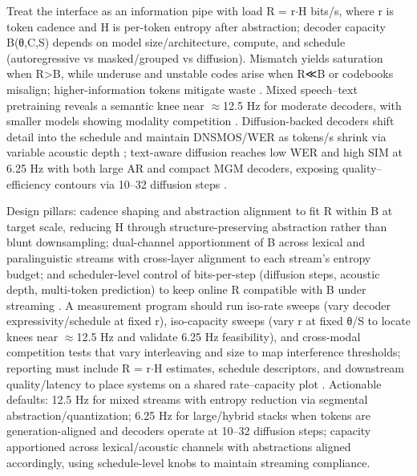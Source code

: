 \documentclass{article}
\begin{document}
Treat the interface as an information pipe with load R = r$\cdot$H bits/s, where r is token cadence and H is per-token entropy after abstraction; decoder capacity B(θ,C,S) depends on model size/architecture, compute, and schedule (autoregressive vs masked/grouped vs diffusion). Mismatch yields saturation when R>B, while underuse and unstable codes arise when R≪B or codebooks misalign; higher-information tokens mitigate waste \cite{huang2024repcodecspeechrepresentationcodectokeniz,chen2023reducingbarriersselfsupervisedlearninghu}. Mixed speech--text pretraining reveals a semantic knee near $\approx$12.5 Hz for moderate decoders, with smaller models showing modality competition \cite{zeng2024scalingspeechtextpretrainingsyntheticint}. Diffusion-backed decoders shift detail into the schedule and maintain DNSMOS/WER as tokens/s shrink via variable acoustic depth \cite{yang2025diffsoundstreamefficientspeechtokenizati}; text-aware diffusion reaches low WER and high SIM at 6.25 Hz with both large AR and compact MGM decoders, exposing quality--efficiency contours via 10--32 diffusion steps \cite{wang2025tadicodectextawarediffusionspeechtokeniz}.

Design pillars: cadence shaping and abstraction alignment to fit R within B at target scale, reducing H through structure-preserving abstraction rather than blunt downsampling; dual-channel apportionment of B across lexical and paralinguistic streams with cross-layer alignment to each stream's entropy budget; and scheduler-level control of bits-per-step (diffusion steps, acoustic depth, multi-token prediction) to keep online R compatible with B under streaming \cite{zeng2024scalingspeechtextpretrainingsyntheticint,yang2025diffsoundstreamefficientspeechtokenizati,wang2025tadicodectextawarediffusionspeechtokeniz}. A measurement program should run iso-rate sweeps (vary decoder expressivity/schedule at fixed r), iso-capacity sweeps (vary r at fixed θ/S to locate knees near $\approx$12.5 Hz and validate 6.25 Hz feasibility), and cross-modal competition tests that vary interleaving and size to map interference thresholds; reporting must include R = r$\cdot$H estimates, schedule descriptors, and downstream quality/latency to place systems on a shared rate--capacity plot \cite{zeng2024scalingspeechtextpretrainingsyntheticint,yang2025diffsoundstreamefficientspeechtokenizati,wang2025tadicodectextawarediffusionspeechtokeniz}. Actionable defaults: 12.5 Hz for mixed streams with entropy reduction via segmental abstraction/quantization; 6.25 Hz for large/hybrid stacks when tokens are generation-aligned and decoders operate at 10--32 diffusion steps; capacity apportioned across lexical/acoustic channels with abstractions aligned accordingly, using schedule-level knobs to maintain streaming compliance.
\end{document}
